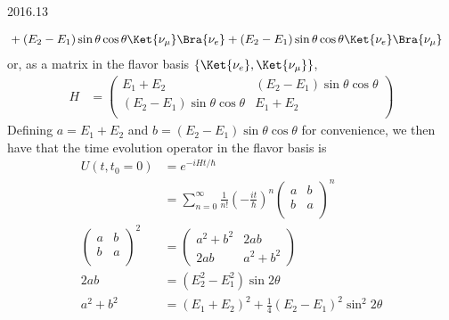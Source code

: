 \documentclass[12pt]{article}
\begin{document}
\begin{solution}{2016.13}
\begin{enumerate}
\begin{align*}
& + (E_2 - E_1) \sin \theta \cos \theta \Ket{\nu_\mu} \Bra{\nu_e}
+ (E_2 - E_1) \sin \theta \cos \theta \Ket{\nu_e} \Bra{\nu_\mu}
\end{align*}
or, as a matrix in the flavor basis $\{\Ket{\nu_e}, \Ket{\nu_\mu}\}$,
\begin{align*}
H & = \left( \begin{array}{cc}
E_1 + E_2 & (E_2 - E_1) \sin \theta \cos \theta \\
(E_2 - E_1) \sin \theta \cos \theta & E_1 + E_2 \\
\end{array} \right)
\end{align*}
Defining $a = E_1 + E_2$ and $b = (E_2 - E_1) \sin \theta \cos \theta$ for convenience, we then have that the time evolution operator in the flavor basis is
\begin{align*}
U(t, t_0 = 0) & = e^{-iH t/\hbar} \\
& = \sum_{n=0}^\infty \frac{1}{n!} \left( -\frac{it}{\hbar} \right)^n \left( \begin{array}{cc}
a & b \\
b & a \\
\end{array} \right)^n \\
\left( \begin{array}{cc}
a & b \\
b & a \\
\end{array} \right)^2 & = \left( \begin{array}{cc}
a^2 + b^2 & 2ab \\
2ab & a^2 + b^2
\end{array} \right) \\
2ab & = (E_2^2 - E_1^2) \sin 2\theta \\
a^2 + b^2 & = (E_1 + E_2)^2 + \frac{1}{4} (E_2 - E_1)^2 \sin^2 2\theta
\end{align*}


\end{enumerate}

\end{solution}
\end{document}
